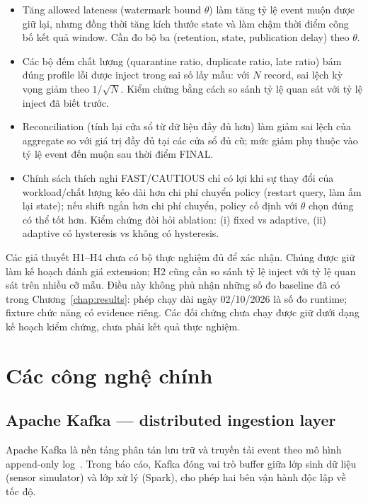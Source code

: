 \begin{itemize}
  \item[H1.] Tăng allowed lateness (watermark bound $\theta$) làm tăng tỷ lệ
        event muộn được giữ lại, nhưng đồng thời tăng kích thước state và làm
        chậm thời điểm công bố kết quả window. Cần đo bộ ba (retention, state,
        publication delay) theo $\theta$.
  \item[H2.] Các bộ đếm chất lượng (quarantine ratio, duplicate ratio, late
        ratio) bám đúng profile lỗi được inject trong sai số lấy mẫu: với
        $N$ record, sai lệch kỳ vọng giảm theo $1/\sqrt{N}$. Kiểm chứng bằng
        cách so sánh tỷ lệ quan sát với tỷ lệ inject đã biết trước.
  \item[H3.] Reconciliation (tính lại cửa sổ từ dữ liệu đầy đủ hơn) làm giảm
        sai lệch của aggregate so với giá trị đầy đủ tại các cửa sổ đủ cũ;
        mức giảm phụ thuộc vào tỷ lệ event đến muộn sau thời điểm FINAL.
  \item[H4.] Chính sách thích nghi FAST/CAUTIOUS chỉ có lợi khi sự thay đổi
        của workload/chất lượng kéo dài hơn chi phí chuyển policy (restart
        query, làm ấm lại state); nếu shift ngắn hơn chi phí chuyển, policy cố
        định với $\theta$ chọn đúng có thể tốt hơn. Kiểm chứng đòi hỏi
        ablation: (i) fixed vs adaptive, (ii) adaptive có hysteresis vs không
        có hysteresis.
\end{itemize}

Các giả thuyết H1--H4 chưa có bộ thực nghiệm đủ để xác nhận. Chúng được
giữ làm kế hoạch đánh giá extension; H2 cũng cần so sánh tỷ lệ inject với
tỷ lệ quan sát trên nhiều cỡ mẫu. Điều này không phủ nhận những số đo
baseline đã có trong Chương~\ref{chap:results}: phép chạy dài
ngày 02/10/2026 là số đo runtime; fixture chức năng có
evidence riêng. Các đối chứng chưa chạy được giữ dưới dạng kế hoạch
kiểm chứng, chưa phải kết quả thực nghiệm.

\section{Các công nghệ chính}

\subsection{Apache Kafka --- distributed ingestion layer}

Apache Kafka là nền tảng phân tán lưu trữ và truyền tải event theo mô hình
append-only log~\cite{kafka_docs_4_3}. Trong báo cáo, Kafka đóng vai trò
buffer giữa lớp sinh dữ liệu (sensor simulator) và lớp xử lý (Spark), cho
phép hai bên vận hành độc lập về tốc độ.

